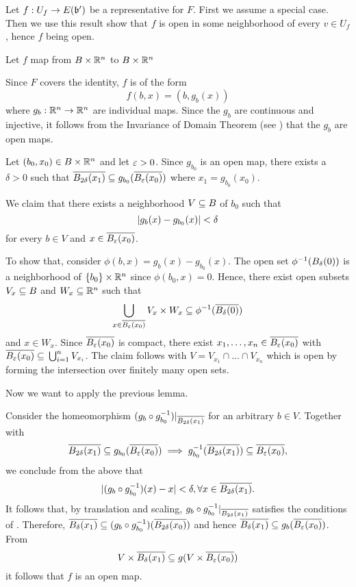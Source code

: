 \begin{myproof} Let $f: U_f \to E(\bb')$ be a representative for $F$. First we assume a special case. Then we use this result show that $f$ is open in some neighborhood of every $v \in U_f$, hence $f$ being open. \begin{steps} \item Let $f$ map from $B \times \mathbb{R}^n$ to $B \times \mathbb{R}^n$

Since $F$ covers the identity, $f$ is of the form \[ f(b, x) = (b, g_b(x)) \] where $g_b: \mathbb{R}^n \to \mathbb{R}^n$ are individual maps. Since the $g_b$ are continuous and injective, it follows from the Invariance of Domain Theorem (see \cite[cor.19.9]{brendon}) that the $g_b$ are open maps.

Let $(b_0, x_0) \in B \times \mathbb{R}^n$ and let $\varepsilon{} > 0$. Since $g_{b_0}$ is an open map, there exists a $\delta > 0$ such that $\clball[2\delta][x_1] \sub g_{b_0}(\clball[\eps][x_0])$ where $x_1 = g_{b_0}(x_0)$.

We claim that there exists a neighborhood $V \subseteq{} B$ of $b_0$ such that \[ \vert{} g_b(x) - g_{b_0}(x) \vert{} < \delta \] for every $b \in V$ and $x \in \clball[\eps][x_0]$.

To show that, consider $\phi(b, x) = g_b(x) - g_{b_0}(x)$. The open set $\inv{\phi}(\ball[\delta])$ is a neighborhood of $\{b_0\} \times \mathbb{R}^n$ since $\phi(b_0, x) = 0$. Hence, there exist open subsets $V_x \subseteq{} B$ and $W_x \subseteq{} \mathbb{R}^n$ such that \[ \bigcup_{x \in \clball[\eps][x_0]} V_x \cross W_x \sub \inv{\phi}(\clball[\delta]) \] and $x \in W_x$. Since $\clball[\eps][x_0]$ is compact, there exist $x_1, \dots, x_n \in \clball[\eps][x_0]$ with $\clball[\eps][x_0] \sub \bigcup_{i = 1}^{n} V_{x_i}$. The claim follows with $V = V_{x_1} \cap \dots \cap V_{x_n}$ which is open by forming the intersection over finitely many open sets.

Now we want to apply the previous lemma.

Consider the homeomorphism $(g_b \circ \inv{g_{b_0}})\restr{\clball[2\delta][x_1]}$ for an arbitrary $b \in V$. Together with \[ \clball[2\delta][x_1] \sub g_{b_0}(\clball[\eps][x_0]) \implies \inv{g_{b_0}}(\clball[2\delta][x_1]) \sub \clball[\eps][x_0], \] we conclude from the above that \[ \abs{(g_b \circ \inv{g_{b_0}})(x) - x} < \delta, \forall x \in \clball[2\delta][x_1]. \] It follows that, by translation and scaling, $g_b \circ \inv{g_{b_0}}\restr{\clball[2\delta][x_1]}$ satisfies the conditions of . Therefore, $\clball[\delta][x_1] \sub (g_b \circ \inv{g_{b_0}})(\clball[2\delta][x_0])$ and hence $\clball[\delta][x_1] \sub g_b(\clball[\eps][x_0])$. From \[ V \cross \clball[\delta][x_1] \sub g(V \cross \clball[\eps][x_0]) \] it follows that $f$ is an open map.


\end{steps}
\end{myproof}
